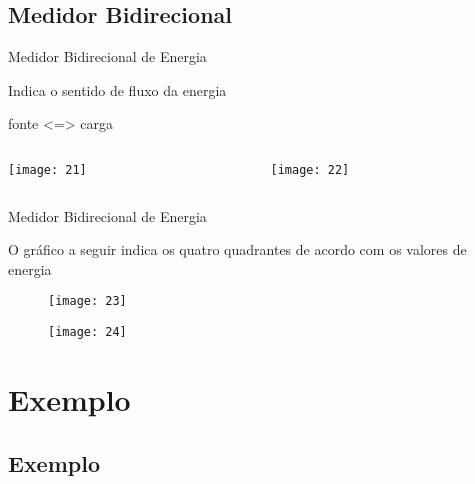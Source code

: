 \subsection{Medidor Bidirecional}

\begin{frame}{Medidor Bidirecional de Energia}

Indica o sentido de fluxo da energia

\vspace{.35cm}
\centering
{\Large fonte <=> carga}

\vspace{.35cm}

\begin{columns}[T]
    \begin{column}{0.5\textwidth}
    	\centering
      	\texttt{[image: 21]}
    \end{column}
    \begin{column}{0.5\textwidth}
    	\centering
      	\texttt{[image: 22]}
    \end{column}
\end{columns}
 
\end{frame}

\begin{frame}{Medidor Bidirecional de Energia}

O gráfico a seguir indica os quatro quadrantes de acordo com os valores de energia

\begin{figure}[H]
\texttt{[image: 23]}
\end{figure}

\vspace{-.5cm}
\begin{figure}[H]
\texttt{[image: 24]}
\end{figure}

\end{frame}

\section{Exemplo}
\subsection*{Exemplo}


